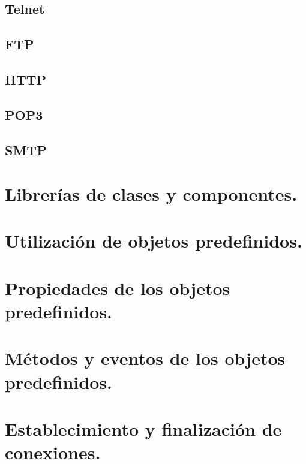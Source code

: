 \documentclass[a4paper,12pt,spanish]{sphinxmanual}
\begin{document}
\subsection{Telnet}
\label{textos/tema4:telnet}

\subsection{FTP}
\label{textos/tema4:ftp}

\subsection{HTTP}
\label{textos/tema4:http}

\subsection{POP3}
\label{textos/tema4:pop3}

\subsection{SMTP}
\label{textos/tema4:smtp}

\section{Librerías de clases y componentes.}
\label{textos/tema4:librerias-de-clases-y-componentes}

\section{Utilización de objetos predefinidos.}
\label{textos/tema4:utilizacion-de-objetos-predefinidos}

\section{Propiedades de los objetos predefinidos.}
\label{textos/tema4:propiedades-de-los-objetos-predefinidos}

\section{Métodos y eventos de los objetos predefinidos.}
\label{textos/tema4:metodos-y-eventos-de-los-objetos-predefinidos}

\section{Establecimiento y finalización de conexiones.}
\label{textos/tema4:establecimiento-y-finalizacion-de-conexiones}
\end{document}
